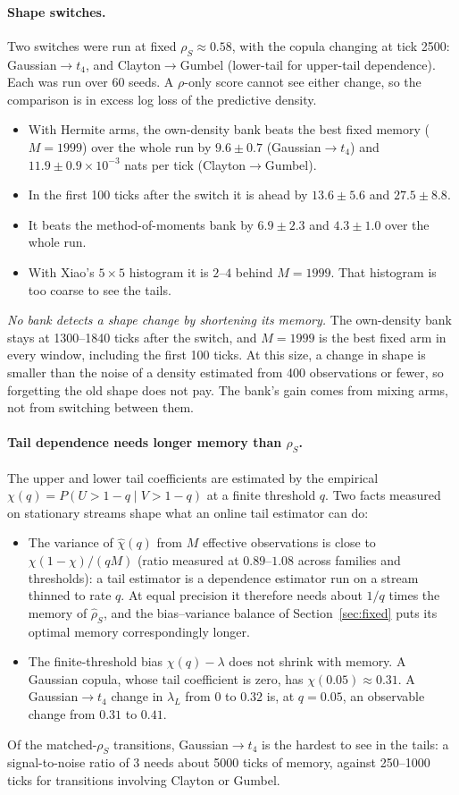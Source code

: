 \paragraph{Shape switches.} Two switches were run at fixed $\rho_S\approx0.58$, with the copula
changing at tick 2500: Gaussian$\to t_4$, and Clayton$\to$Gumbel (lower-tail for upper-tail
dependence). Each was run over 60 seeds. A $\rho$-only score cannot see either change, so the
comparison is in excess log loss of the predictive density.
\begin{itemize}
  \item With Hermite arms, the own-density bank beats the best fixed memory ($M=1999$) over the
    whole run by $9.6\pm0.7$ (Gaussian$\to t_4$) and $11.9\pm0.9\times10^{-3}$ nats per tick
    (Clayton$\to$Gumbel).
  \item In the first 100 ticks after the switch it is ahead by $13.6\pm5.6$ and $27.5\pm8.8$.
  \item It beats the method-of-moments bank by $6.9\pm2.3$ and $4.3\pm1.0$ over the whole run.
  \item With Xiao's $5\times5$ histogram it is $2$--$4$ behind $M=1999$. That histogram is too
    coarse to see the tails.
\end{itemize}
\emph{No bank detects a shape change by shortening its memory.} The own-density bank stays at
1300--1840 ticks after the switch, and $M=1999$ is the best fixed arm in every window, including
the first 100 ticks. At this size, a change in shape is smaller than the noise of a density
estimated from 400 observations or fewer, so forgetting the old shape does not pay. The bank's
gain comes from mixing arms, not from switching between them.
\paragraph{Tail dependence needs longer memory than $\rho_S$.} The upper and lower tail coefficients
are estimated by the empirical $\chi(q)=P(U>1-q\mid V>1-q)$ at a finite threshold $q$. Two facts
measured on stationary streams shape what an online tail estimator can do:
\begin{itemize}
  \item The variance of $\hat\chi(q)$ from $M$ effective observations is close to
    $\chi(1-\chi)/(qM)$ (ratio measured at $0.89$--$1.08$ across families and thresholds): a tail
    estimator is a dependence estimator run on a stream thinned to rate $q$. At equal precision it
    therefore needs about $1/q$ times the memory of $\hat\rho_S$, and the bias--variance balance of
    Section~\ref{sec:fixed} puts its optimal memory correspondingly longer.
  \item The finite-threshold bias $\chi(q)-\lambda$ does not shrink with memory. A Gaussian copula,
    whose tail coefficient is zero, has $\chi(0.05)\approx0.31$. A Gaussian$\to t_4$ change in
    $\lambda_L$ from $0$ to $0.32$ is, at $q=0.05$, an observable change from $0.31$ to $0.41$.
\end{itemize}
Of the matched-$\rho_S$ transitions, Gaussian$\to t_4$ is the hardest to see in the tails: a
signal-to-noise ratio of 3 needs about 5000 ticks of memory, against 250--1000 ticks for transitions
involving Clayton or Gumbel.

